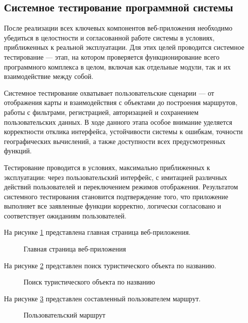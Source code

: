 \subsection{Системное тестирование программной системы}

После реализации всех ключевых компонентов веб-приложения необходимо убедиться в целостности и согласованной работе системы в условиях, приближенных к реальной эксплуатации\cite{b28}. Для этих целей проводится системное тестирование — этап, на котором проверяется функционирование всего программного комплекса в целом, включая как отдельные модули, так и их взаимодействие между собой.

Системное тестирование охватывает пользовательские сценарии — от отображения карты и взаимодействия с объектами до построения маршрутов, работы с фильтрами, регистрацией, авторизацией и сохранением пользовательских данных. В ходе данного этапа особое внимание уделяется корректности отклика интерфейса, устойчивости системы к ошибкам, точности географических вычислений, а также доступности всех предусмотренных функций.

Тестирование проводится в условиях, максимально приближенных к эксплуатации: через пользовательский интерфейс, с имитацией различных действий пользователей и переключением режимов отображения. Результатом системного тестирования становится подтверждение того, что приложение выполняет все заявленные функции корректно, логически согласовано и соответствует ожиданиям пользователей.

\newpage
На рисунке \ref{r1:image} представлена главная страница веб-приложения.

\begin{figure}[H] %
\center{\texttt{[image: r1]}}
\caption{Главная страница веб-приложения}
\label{r1:image}
\end{figure}

\newpage
На рисунке \ref{r2:image} представлен поиск туристического объекта по названию.

\begin{figure}[H]
\center{\texttt{[image: r2]}}
\caption{Поиск туристического объекта по названию}
\label{r2:image}
\end{figure}

\newpage
На рисунке \ref{r3:image} представлен составленный пользователем маршрут.

\begin{figure}[H]
\center{\texttt{[image: r3]}}
\caption{Пользовательский маршрут}
\label{r3:image}
\end{figure}

